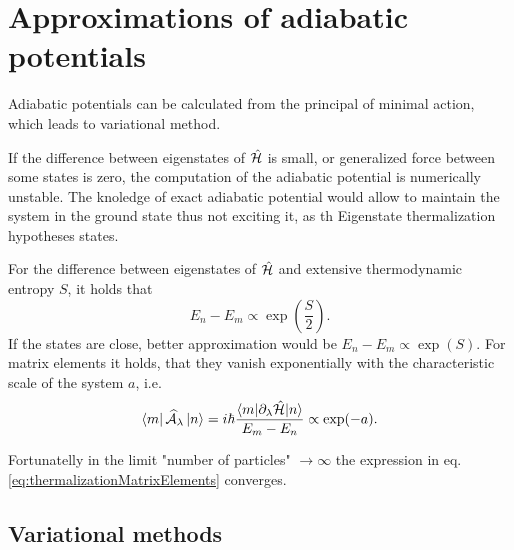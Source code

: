 \section{Approximations of adiabatic potentials}
Adiabatic potentials can be calculated from the principal of minimal action, which leads to variational method.

If the difference between eigenstates of $\hat{\mathcal{H}}$ is small, or generalized force between some states is zero, the computation of the adiabatic potential is numerically unstable. The knoledge of exact adiabatic potential would allow to maintain the system in the ground state thus not exciting it, as th Eigenstate thermalization hypotheses states.

\begin{hypot}
  For the difference between eigenstates of $\hat{\mathcal{H}}$ and extensive thermodynamic entropy $S$, it holds that
    \begin{equation}
    E_n-E_m\propto \exp\left(\frac{S}{2}\right).
  \end{equation}
  If the states are close, better approximation would be $E_n-E_m\propto \exp(S)$. For matrix elements it holds, that they vanish exponentially with the characteristic scale of the system $a$, i.e.
  \begin{equation}
    \bra{m}\mathcal{\widehat{A}}_\lambda\ket{n} = i\hbar\frac{\braket{m|\partial_\lambda \hat{\mathcal{H}}|n}}{E_m-E_n} \propto \exp(-a).
    \label{eq:thermalizationMatrixElements}
\end{equation}
\end{hypot}
Fortunatelly in the limit "number of particles" $\rightarrow \infty$ the expression in eq. \ref{eq:thermalizationMatrixElements} converges.

\subsection{Variational methods}
